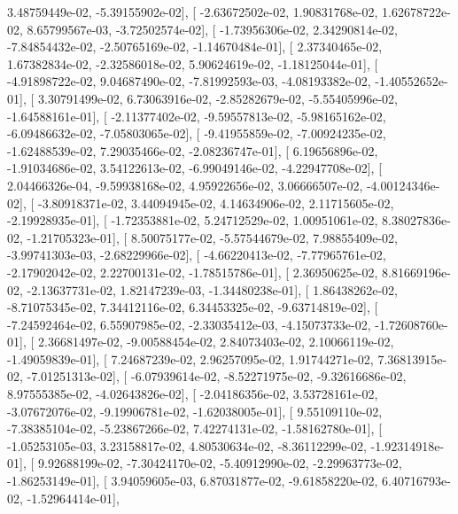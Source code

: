 \documentclass{article}
\begin{document}
          3.48759449e-02,  -5.39155902e-02],
       [ -2.63672502e-02,   1.90831768e-02,   1.62678722e-02,
          8.65799567e-03,  -3.72502574e-02],
       [ -1.73956306e-02,   2.34290814e-02,  -7.84854432e-02,
         -2.50765169e-02,  -1.14670484e-01],
       [  2.37340465e-02,   1.67382834e-02,  -2.32586018e-02,
          5.90624619e-02,  -1.18125044e-01],
       [ -4.91898722e-02,   9.04687490e-02,  -7.81992593e-03,
         -4.08193382e-02,  -1.40552652e-01],
       [  3.30791499e-02,   6.73063916e-02,  -2.85282679e-02,
         -5.55405996e-02,  -1.64588161e-01],
       [ -2.11377402e-02,  -9.59557813e-02,  -5.98165162e-02,
         -6.09486632e-02,  -7.05803065e-02],
       [ -9.41955859e-02,  -7.00924235e-02,  -1.62488539e-02,
          7.29035466e-02,  -2.08236747e-01],
       [  6.19656896e-02,  -1.91034686e-02,   3.54122613e-02,
         -6.99049146e-02,  -4.22947708e-02],
       [  2.04466326e-04,  -9.59938168e-02,   4.95922656e-02,
          3.06666507e-02,  -4.00124346e-02],
       [ -3.80918371e-02,   3.44094945e-02,   4.14634906e-02,
          2.11715605e-02,  -2.19928935e-01],
       [ -1.72353881e-02,   5.24712529e-02,   1.00951061e-02,
          8.38027836e-02,  -1.21705323e-01],
       [  8.50075177e-02,  -5.57544679e-02,   7.98855409e-02,
         -3.99741303e-03,  -2.68229966e-02],
       [ -4.66220413e-02,  -7.77965761e-02,  -2.17902042e-02,
          2.22700131e-02,  -1.78515786e-01],
       [  2.36950625e-02,   8.81669196e-02,  -2.13637731e-02,
          1.82147239e-03,  -1.34480238e-01],
       [  1.86438262e-02,  -8.71075345e-02,   7.34412116e-02,
          6.34453325e-02,  -9.63714819e-02],
       [ -7.24592464e-02,   6.55907985e-02,  -2.33035412e-03,
         -4.15073733e-02,  -1.72608760e-01],
       [  2.36681497e-02,  -9.00588454e-02,   2.84073403e-02,
          2.10066119e-02,  -1.49059839e-01],
       [  7.24687239e-02,   2.96257095e-02,   1.91744271e-02,
          7.36813915e-02,  -7.01251313e-02],
       [ -6.07939614e-02,  -8.52271975e-02,  -9.32616686e-02,
          8.97555385e-02,  -4.02643826e-02],
       [ -2.04186356e-02,   3.53728161e-02,  -3.07672076e-02,
         -9.19906781e-02,  -1.62038005e-01],
       [  9.55109110e-02,  -7.38385104e-02,  -5.23867266e-02,
          7.42274131e-02,  -1.58162780e-01],
       [ -1.05253105e-03,   3.23158817e-02,   4.80530634e-02,
         -8.36112299e-02,  -1.92314918e-01],
       [  9.92688199e-02,  -7.30424170e-02,  -5.40912990e-02,
         -2.29963773e-02,  -1.86253149e-01],
       [  3.94059605e-03,   6.87031877e-02,  -9.61858220e-02,
          6.40716793e-02,  -1.52964414e-01],
\end{document}
